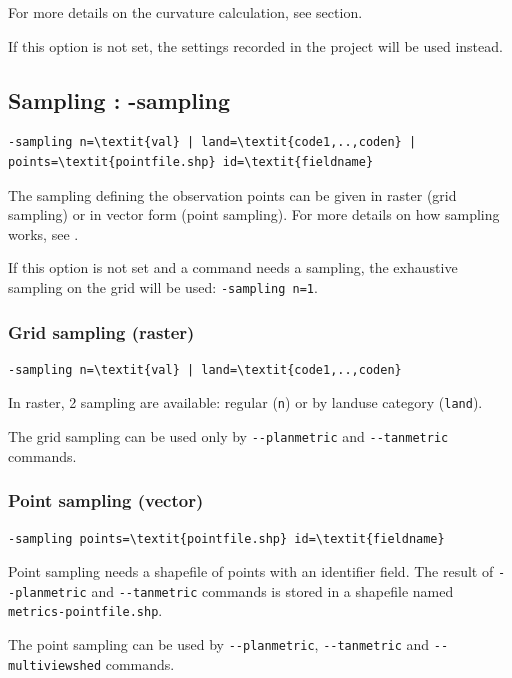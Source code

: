 \documentclass{report}
\begin{document}
For more details on the curvature calculation, see  section.

If this option is not set, the settings recorded in the project will be used instead.


\subsection{Sampling : -sampling}
\begin{Verbatim}[commandchars=\\\{\}]
-sampling n=\textit{val} | land=\textit{code1,..,coden} | points=\textit{pointfile.shp} id=\textit{fieldname}
\end{Verbatim}
The sampling defining the observation points can be given in raster (grid sampling) or in vector form (point sampling). For more details on how sampling works, see .

If this option is not set and a command needs a sampling, the exhaustive sampling on the grid will be used: \verb|-sampling n=1|.

\subsubsection{Grid sampling (raster)}
\begin{Verbatim}[commandchars=\\\{\}]
-sampling n=\textit{val} | land=\textit{code1,..,coden}
\end{Verbatim}
In raster, 2 sampling are available: regular (\verb|n|) or by landuse category (\verb|land|).

The grid sampling can be used only by \verb|--planmetric| and \verb|--tanmetric| commands.

\subsubsection{Point sampling (vector)}
\begin{Verbatim}[commandchars=\\\{\}]
-sampling points=\textit{pointfile.shp} id=\textit{fieldname}
\end{Verbatim}
Point sampling needs a shapefile of points with an identifier field.
The result of \verb|--planmetric| and \verb|--tanmetric| commands is stored in a shapefile named \verb|metrics-pointfile.shp|.

The point sampling can be used by \verb|--planmetric|, \verb|--tanmetric| and \verb|--multiviewshed| commands.
\end{document}
